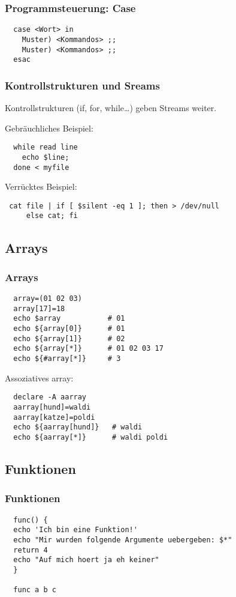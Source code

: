 \documentclass{beamer}
\begin{document}
\begin{frame}[fragile]
 \frametitle{Programmsteuerung: Case} 
  \begin{lstlisting}
  case <Wort> in
    Muster) <Kommandos> ;;
    Muster) <Kommandos> ;;
  esac
  \end{lstlisting}
\end{frame}

\begin{frame}[fragile]
 \frametitle{Kontrollstrukturen und Sreams}
 
 Kontrollstrukturen (if, for, while…) geben Streams weiter.
 \medskip 
 
 Gebräuchliches Beispiel:
 \begin{lstlisting}
  while read line
    echo $line;
  done < myfile
 \end{lstlisting}
 
 Verrücktes Beispiel:
 \begin{lstlisting}
 cat file | if [ $silent -eq 1 ]; then > /dev/null
     else cat; fi
 \end{lstlisting}
\end{frame}

\subsection{Arrays}
\begin{frame}[fragile]
 \frametitle{Arrays}
 \begin{lstlisting}
  array=(01 02 03)
  array[17]=18
  echo $array           # 01
  echo ${array[0]}      # 01
  echo ${array[1]}      # 02
  echo ${array[*]}      # 01 02 03 17
  echo ${#array[*]}     # 3
 \end{lstlisting}
 
 Assoziatives array:
 \begin{lstlisting}
  declare -A aarray
  aarray[hund]=waldi
  aarray[katze]=poldi
  echo ${aarray[hund]}   # waldi
  echo ${aarray[*]}      # waldi poldi
 \end{lstlisting}
\end{frame}


\subsection{Funktionen}
\begin{frame}[fragile]
 \frametitle{Funktionen}
 
 \begin{lstlisting}
  func() {
  echo 'Ich bin eine Funktion!'
  echo "Mir wurden folgende Argumente uebergeben: $*"
  return 4
  echo "Auf mich hoert ja eh keiner"
  }
  
  func a b c
 \end{lstlisting}
\end{frame}
\end{document}
